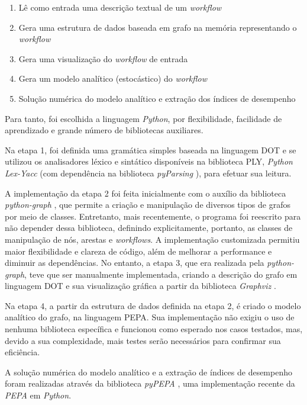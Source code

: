 \documentclass[a4paper,11pt]{article}
\begin{document}
  		\begin{enumerate}
  			\item Lê como entrada uma descrição textual de um \emph{workflow}
  			\item Gera uma estrutura de dados baseada em grafo na memória representando o \emph{workflow}
  			\item Gera uma visualização do \emph{workflow} de entrada
  			\item Gera um modelo analítico (estocástico) do \emph{workflow}
            \item Soluç\~ao num\'erica do modelo anal\'itico e extraç\~ao dos \'indices de desempenho
  		\end{enumerate}

  		Para tanto, foi escolhida a linguagem \emph{Python}, por flexibilidade, facilidade de aprendizado e grande número de bibliotecas auxiliares.

  		Na etapa 1, foi definida uma gramática simples baseada na linguagem DOT \cite{web:dot} e se utilizou os analisadores léxico e sintático disponíveis na biblioteca PLY, \emph{Python Lex-Yacc} \cite{web:ply} (com dependência na biblioteca \emph{pyParsing} \cite{web:pyparsing}), para efetuar sua leitura.

        A implementaç\~ao da etapa 2 foi feita inicialmente com o aux\'ilio da biblioteca \emph{python-graph} \cite{web:python-graph}, que permite a criação e manipulação de diversos tipos de grafos por meio de classes. Entretanto, mais recentemente, o programa foi reescrito para n\~ao depender dessa biblioteca, definindo explicitamente, portanto, as classes de manipulaç\~ao de n\'os, arestas e \emph{workflows}. A implementação customizada permitiu maior flexibilidade e clareza de código, além de melhorar a performance e diminuir as dependências. No entanto, a etapa 3, que era realizada pela \emph{python-graph}, teve que ser manualmente implementada, criando a descrição do grafo em linguagem DOT e sua visualização gráfica a partir da biblioteca \emph{Graphviz} \cite{web:graphviz}.

        Na etapa 4, a partir da estrutura de dados definida na etapa 2, \'e criado o modelo analítico do grafo, na linguagem PEPA. Sua implementação não exigiu o uso de nenhuma biblioteca específica e funcionou como esperado nos casos testados, mas, devido a sua complexidade, mais testes serão necessários para confirmar sua eficiência. 

        A solução numérica do modelo analítico e a extraç\~ao de \'indices de desempenho foram realizadas atrav\'es da biblioteca \emph{pyPEPA} \cite{web:pypepa}, uma implementação recente da \emph{PEPA} em \emph{Python}.
\end{document}
